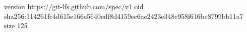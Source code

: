 version https://git-lfs.github.com/spec/v1
oid sha256:114261fc4d615e166e5640edf8d4159ec6ae2423e348c958f616bc8799bb11a7
size 125
